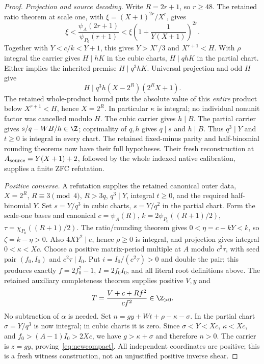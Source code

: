 \begin{proof}
\emph{Projection and source decoding.}
Write $R=2r+1$, so $r\ge48$. The retained ratio theorem at scale one,
with $\xi=(X+1)^{2r}/X^r$, gives
\[
 \xi<\frac{\psi_A(2r+1)}{\psi_{P_0}(r+1)}
 <\xi\left(1+\frac1{Y(X+1)}\right)^{2r}.
\]
Together with $Y<c/k<Y+1$, this gives $Y>X^r/3$ and
$X^{r+1}<H$. With $\rho$ integral the carrier gives
$H\mid hK$ in the cubic charts, $H\mid qhK$ in the partial chart.
Either implies the inherited premise $H\mid q^3hK$.
Universal projection and odd $H$ give
\[
 H\mid q^3h(X-2^R)(2^RX+1).
\]
The retained whole-product bound puts the absolute value of this
\emph{entire} product below $X^{r+1}<H$, hence $X=2^R$.
In particular $\kappa$ is integral; no individual nonunit factor was
cancelled modulo $H$.
The cubic carrier gives $h\mid B$. The partial carrier gives
$s/q-WB/h\in\Z$; coprimality of $q,h$ gives $q\mid s$ and $h\mid B$.
Thus $q^3\mid Y$ and $t\ge0$ is integral in every chart.
The retained fixed-minus parity and half-binomial rounding theorems
now have their full hypotheses. Their fresh reconstruction at
$A_{\rm source}=Y(X+1)+2$, followed by the whole indexed native
calibration, supplies a finite ZFC refutation.

\emph{Positive converse.}
A refutation supplies the retained canonical outer data,
$X=2^R$, $R\equiv3\pmod4$, $R>3q$, $q^3\mid Y$, integral $t\ge0$,
and the required half-binomial $Y$. Set $s=Y/q^3$ in cubic charts,
$s=Y/q^2$ in the partial chart. Form the scale-one bases and canonical
$c=\psi_A(R)$, $k=2\psi_{P_0}((R+1)/2)$, $\tau=\chi_{P_0}((R+1)/2)$.
The ratio/rounding theorem gives $0<\eta=c-kY<k$, so
$\zeta=k-\eta>0$. Also $4XY^2\mid e$, hence $\rho\ge0$ is integral,
and projection gives integral $0<\kappa<Xc$.
Choose a positive matrix-period multiple at $A$ modulo $c^2\tau$,
with seed pair $(f_0,I_0)$ and $c^2\tau\mid I_0$.
Put $i=I_0/(c^2\tau)>0$ and double the pair; this produces exactly
$f=2f_0^2-1$, $I=2f_0I_0$, and all literal root definitions above.
The retained auxiliary completeness theorem supplies positive $V,y$ and
\[
 T=\frac{V+c+Rf^2}{cf^2}\in\Z_{>0}.
\]
No subtraction of $\alpha$ is needed. Set
$n=gy+Wt+\rho-\kappa-\sigma$.
In the partial chart $\sigma=Y/q^3$ is now integral; in cubic charts
it is zero. Since $\sigma<Y<Xc$, $\kappa<Xc$, and
$f_0>(A-1)I_0>2Xc$, we have $g>\kappa+\sigma$ and therefore $n>0$.
The carrier is $z=gy$, proving~\eqref{eq:newcompact}. All independent
coordinates are positive; this is a fresh witness construction, not an
unjustified positive inverse shear.
\end{proof}

